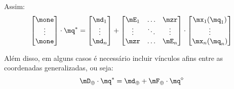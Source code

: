 \documentclass[]{politex}
\begin{document}
Assim:
\begin{equation} \label{eq:VinculosPosicao}
\begin{bmatrix}
\mone\\
\vdots\\
\mone
\end{bmatrix}\cdot \mq^\ast =
\begin{bmatrix}
\md_1 \\
\vdots \\
\md_n
\end{bmatrix}
+
\begin{bmatrix}
\mE_1 & \ldots & \mzr\\
\vdots & \ddots & \vdots\\
\mzr &\ldots  & \mE_{n}
\end{bmatrix}
\cdot
\begin{bmatrix}
\mx_1(\mq_1) \\
\vdots \\
\mx_n(\mq_n)
\end{bmatrix}
\end{equation}

Além disso, em alguns casos é necessário incluir vínculos afins entre as coordenadas generalizadas, ou seja:
\begin{equation} \label{eq:VinculosPosicaoAfins}
\mD_{\oplus}\cdot\mq^\ast = \md_{\oplus} + \mF_{\oplus}\cdot\mq^\diamond
\end{equation}
\end{document}
